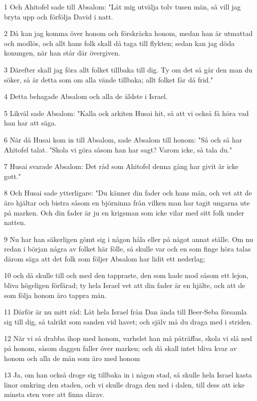 \par 1 Och Ahitofel sade till Absalom: "Låt mig utvälja tolv tusen män, så vill jag bryta upp och förfölja David i natt.
\par 2 Då kan jag komma över honom och förskräcka honom, medan han är utmattad och modlös, och allt hans folk skall då taga till flykten; sedan kan jag döda konungen, när han står där övergiven.
\par 3 Därefter skall jag föra allt folket tillbaka till dig. Ty om det så går den man du söker, så är detta som om alla vände tillbaka; allt folket får då frid."
\par 4 Detta behagade Absalom och alla de äldste i Israel.
\par 5 Likväl sade Absalom: "Kalla ock arkiten Husai hit, så att vi också få höra vad han har att säga.
\par 6 När då Husai kom in till Absalom, sade Absalom till honom: "Så och så har Ahitofel talat. "Skola vi göra såsom han har sagt? Varom icke, så tala du."
\par 7 Husai svarade Absalom: Det råd som Ahitofel denna gång har givit är icke gott."
\par 8 Och Husai sade ytterligare: "Du känner din fader och hans män, och vet att de äro hjältar och bistra såsom en björninna från vilken man har tagit ungarna ute på marken. Och din fader är ju en krigsman som icke vilar med sitt folk under natten.
\par 9 Nu har han säkerligen gömt sig i någon håla eller på något annat ställe. Om nu redan i början några av folket här fölle, så skulle var och en som finge höra talas därom säga att det folk som följer Absalom har lidit ett nederlag;
\par 10 och då skulle till och med den tappraste, den som hade mod såsom ett lejon, bliva högeligen förfärad; ty hela Israel vet att din fader är en hjälte, och att de som följa honom äro tappra män.
\par 11 Därför är nu mitt råd: Låt hela Israel från Dan ända till Beer-Seba församla sig till dig, så talrikt som sanden vid havet; och själv må du draga med i striden.
\par 12 När vi så drabba ihop med honom, varhelst han må påträffas, skola vi slå ned på honom, såsom daggen faller över marken; och då skall intet bliva kvar av honom och alla de män som äro med honom
\par 13 Ja, om han också droge sig tillbaka in i någon stad, så skulle hela Israel kasta linor omkring den staden, och vi skulle draga den ned i dalen, till dess att icke minsta sten vore att finna därav.
